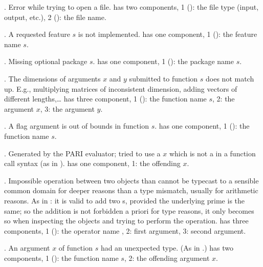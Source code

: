  \item {}. Error while trying to open a file.
  has two components, 1 (): the file type (input, output,
 etc.), 2 (): the file name.

 \item {}. A requested feature $s$ is not implemented.
  has one component, 1 (): the feature name $s$.

 \item {}. Missing optional package $s$.
  has one component, 1 (): the package name $s$.


 \item {}. The dimensions of arguments $x$ and $y$ submitted
 to function $s$ does not match up.
 E.g., multiplying matrices of inconsistent dimension, adding vectors of
 different lengths,\dots
  has three component, 1 (): the function name $s$, 2: the
 argument $x$, 3: the argument $y$.

 \item {}. A flag argument is out of bounds in function $s$.
  has one component, 1 (): the function name $s$.

 \item {}. Generated by the PARI evaluator; tried to use a
 $x$ which is not a  in a function call syntax (as in
).
  has one component, 1: the offending  $x$.

 \item {}. Impossible operation between two objects than cannot
 be typecast to a sensible common domain for deeper reasons than a type
 mismatch, usually for arithmetic reasons. As in : it is
 valid to add two s, provided the underlying prime is the same; so
 the addition is not forbidden a priori for type reasons, it only becomes so
 when inspecting the objects and trying to perform the operation.
  has three components, 1 (): the operator name ,
 2: first argument, 3: second argument.

 \item {}. An argument $x$ of function $s$ had an unexpected type.
 (As in .)
  has two components, 1 (): the function name $s$,
 2: the offending argument $x$.

